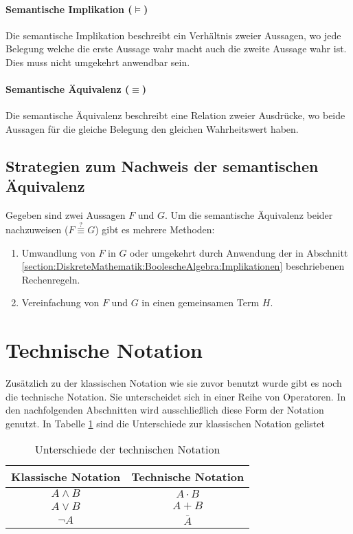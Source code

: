 \documentclass[../main.tex]{subfiles}
\begin{document}
        \paragraph{Semantische Implikation ($\models$)} Die semantische Implikation beschreibt ein Verhältnis zweier Aussagen, wo jede Belegung welche die erste Aussage wahr macht auch die zweite Aussage wahr ist. Dies muss nicht umgekehrt anwendbar sein.
        
        \paragraph{Semantische Äquivalenz ($\equiv$)} Die semantische Äquivalenz beschreibt eine Relation zweier Ausdrücke, wo beide Aussagen für die gleiche Belegung den gleichen Wahrheitswert haben.
        
        \subsection{Strategien zum Nachweis der semantischen Äquivalenz}
        	Gegeben sind zwei Aussagen $F$ und $G$. Um die semantische Äquivalenz beider nachzuweisen ($F \stackrel{?}{\equiv} G$) gibt es mehrere Methoden:
        	\begin{enumerate}
        		\item Umwandlung von $F$ in $G$ oder umgekehrt durch Anwendung der in Abschnitt \ref{section:DiskreteMathematik:BoolescheAlgebra:Implikationen} beschriebenen Rechenregeln.
        		\item Vereinfachung von $F$ und $G$ in einen gemeinsamen Term $H$.
        	\end{enumerate}
                
    \section{Technische Notation}
        Zusätzlich zu der klassischen Notation wie sie zuvor benutzt wurde gibt es noch die technische Notation. Sie unterscheidet sich in einer Reihe von Operatoren. In den nachfolgenden Abschnitten wird ausschließlich diese Form der Notation genutzt. In Tabelle \ref{table:DiskreteMathematik:BoolscheAlgebra:TechnischeNotation} sind die Unterschiede zur klassischen Notation gelistet
        \begin{table}
            \centering
            \begin{tabular}{c c}
                Klassische Notation & Technische Notation\\
                \hline
                \noalign{\smallskip}
                $A \land B$ & $A \cdot B$ \\
                \noalign{\smallskip}
                $A \lor B$ & $A + B$ \\
                \noalign{\smallskip}
                $\lnot A$ & $\bar{A}$
            \end{tabular}
            \caption{Unterschiede der technischen Notation}
            \label{table:DiskreteMathematik:BoolscheAlgebra:TechnischeNotation}
        \end{table}
            
\end{document}
